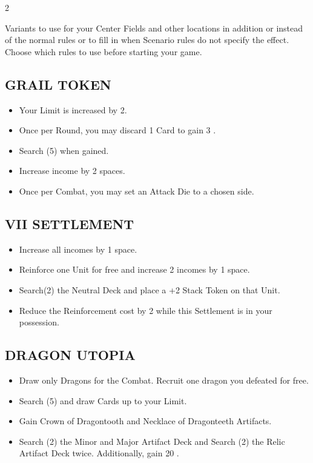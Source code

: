 
\begin{multicols*}{2}

Variants to use for your Center Fields and other locations in addition or instead of the normal rules or to fill in when Scenario rules do not specify the effect. Choose which rules to use before starting your game.

\subsection*{\MakeUppercase{Grail Token}}
\begin{itemize}
  \item Your  Limit is increased by 2.
  \item Once per Round, you may discard 1 Card to gain 3 .
  \item Search (5)  when gained.
  \item Increase  income by 2 spaces.
  \item Once per Combat, you may set an Attack Die to a chosen side.
\end{itemize}

\subsection*{\MakeUppercase{VII Settlement}}
\begin{itemize}
  \item Increase all incomes by 1 space.
  \item Reinforce one  Unit for free and increase 2 incomes by 1 space.
  \item Search(2) the  Neutral Deck and place a +2  Stack Token on that Unit.
  \item Reduce the Reinforcement cost by 2  while this Settlement is in your possession.
\end{itemize}

\subsection*{\MakeUppercase{Dragon Utopia}}
\begin{itemize}
  \item Draw only Dragons for the Combat. Recruit one dragon you defeated for free.
  \item Search (5)  and draw Cards up to your  Limit.
  \item Gain Crown of Dragontooth and Necklace of Dragonteeth Artifacts.
  \item Search (2) the Minor and Major Artifact Deck and Search (2) the Relic Artifact Deck twice. Additionally, gain 20 .
\end{itemize}


\end{multicols*}
